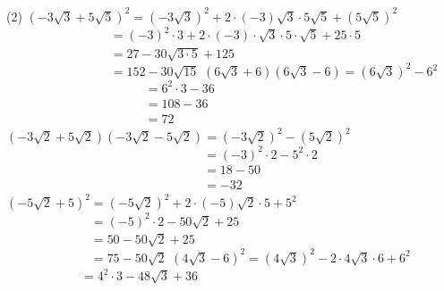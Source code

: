 \documentclass[a4paper,12pt]{report}
\begin{document}


\begin{core}\phantom{ }

\begin{tasks}(2)
\task $\left(-3 \sqrt{3} +5\sqrt{5}\right)^{2}=
                    \left(-3 \sqrt{3} \right)^{2}+2\cdot (-3)\sqrt{3}\cdot 5\sqrt{5}+\left(5\sqrt{5}\right)^{2}$\\
                    $\phantom{\left(-3 \sqrt{3} +5\sqrt{5}\right)^{2}}=(-3)^{2}\cdot 3 +2\cdot (-3)
                    \cdot \sqrt{3}\cdot 5    \cdot\sqrt{5}+ 25\cdot 5$\\
                    $\phantom{\left(-3 \sqrt{3} +5\sqrt{5}\right)^{2}}=27 -30\sqrt{3\cdot5} +125$\\$\phantom{\left(-3 \sqrt{3} +5\sqrt{5}\right)^{2}}={{152-30\sqrt{15}}}$
\task $\left(6 \sqrt{3} +6\right)\left(6 \sqrt{3}-6\right)=\left(6 \sqrt{3} \right)^{2}-6^{2}$\\
                    $\phantom{\left(6 \sqrt{3} +6\right)\left(6 \sqrt{3}-6\right)}=6^{2}\cdot 3-36$\\
                        $\phantom{\left(6 \sqrt{3} +6\right)\left(6 \sqrt{3}-6\right)}=108-36$\\$\phantom{\left(6 \sqrt{3} +6\right)\left(6 \sqrt{3}-6\right)}={{72}}$
\task $\left(-3 \sqrt{2} +5\sqrt{2}\right)\left(-3 \sqrt{2}-5\sqrt{2}\right)=\left(-3 \sqrt{2} \right)^{2}-\left(5\sqrt{2}\right)^{2}$\\
                $\phantom{\left(-3 \sqrt{2} +5\sqrt{2}\right)\left(-3 \sqrt{2}-5\sqrt{2}\right)}=(-3)^{2}\cdot 2-5^{2}\cdot 2$\\
                    $\phantom{\left(-3 \sqrt{2} +5\sqrt{2}\right)\left(-3 \sqrt{2}-5\sqrt{2}\right)}=18-50$\\$\phantom{\left(-3 \sqrt{2} +5\sqrt{2}\right)\left(-3 \sqrt{2}-5\sqrt{2}\right)}={{-32}}$
\task $\left(-5 \sqrt{2} +5\right)^{2}=\left(-5 \sqrt{2} \right)^{2}+2\cdot (-5)\sqrt{2}\cdot 5+5^{2}$\\
                    $\phantom{\left(-5 \sqrt{2} +5\right)^{2}}=(-5)^{2}\cdot 2 -50\sqrt{2}+ 25$\\
                    $\phantom{\left(-5 \sqrt{2} +5\right)^{2}}=50-50\sqrt{2}+25$\\$\phantom{\left(-5 \sqrt{2} +5\right)^{2}}={{75-50\sqrt{2}}}$
\task $\left(4 \sqrt{3} -6\right)^{2}=\left(4 \sqrt{3} \right)^{2}-2\cdot 4\sqrt{3}\cdot 6+6^{2}$\\
                    $\phantom{\left(4 \sqrt{3} -6\right)^{2}}=4^{2}\cdot 3 -48\sqrt{3}+ 36$\\

\end{tasks}
\end{core}
\end{document}

